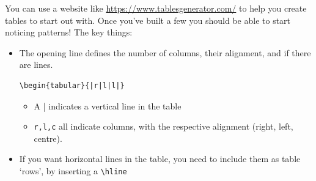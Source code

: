 \documentclass[12pt]{article}
\begin{document}
You can use a website like \url{https://www.tablesgenerator.com/} to help you create tables to start out with. Once you've built a few you should be able to start noticing patterns! The key things:
\begin{itemize}
    \item The opening line defines the number of columns, their alignment, and if there are lines.
    \begin{verbatim}\begin{tabular}{|r|l|l|} \end{verbatim} 
    \begin{itemize}
        \item A | indicates a vertical line in the table
        \item \verb|r,l,c| all indicate columns, with the respective alignment (right, left, centre).
    \end{itemize}
    \item If you want horizontal lines in the table, you need to include them as table `rows', by inserting a \verb|\hline|
\end{itemize}

\FloatBarrier %

\printbibliography
\end{document}
